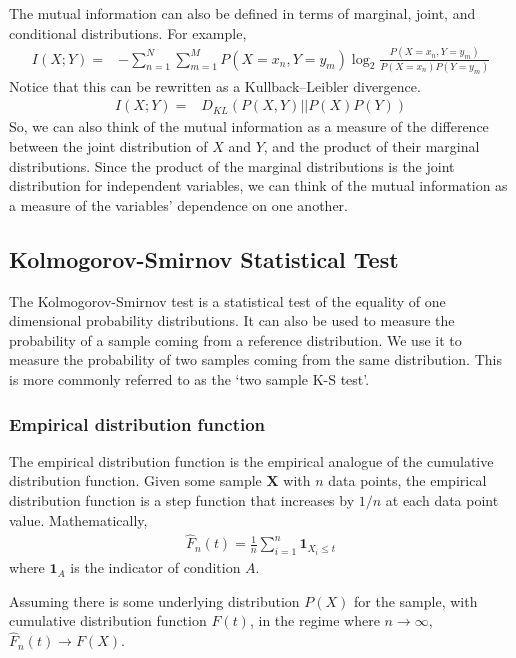 \documentclass[a4paper,12pt]{article}
\theoremstyle{definition}
\begin{document}
The mutual information can also be defined in terms of marginal, joint, and conditional distributions. For example,
\begin{align}
I(X;Y)  =& -\sum_{n=1}^N \sum_{m=1}^M P(X=x_n, Y=y_m) \log _2 \frac{P(X=x_n, Y=y_m)}{P(X=x_n) P(Y=y_m)}
\end{align}
Notice that this can be rewritten as a Kullback–Leibler divergence.
\begin{align}
I(X;Y)  =& D_{KL}(P(X,Y)|| P(X)P(Y))
\end{align}
So, we can also think of the mutual information as a measure of the difference between the joint distribution of $X$ and $Y$, and the product of their marginal distributions. Since the product of the marginal distributions is the joint distribution for independent variables, we can think of the mutual information as a measure of the variables' dependence on one another.

\subsection{Kolmogorov-Smirnov Statistical Test}\label{sec:ks_test}
The Kolmogorov-Smirnov test is a statistical test of the equality of one dimensional probability distributions. It can also be used to measure the probability of a sample coming from a reference distribution. We use it to measure the probability of two samples coming from the same distribution. This is more commonly referred to as the `two sample K-S test'.

\subsubsection{Empirical distribution function}
The empirical distribution function is the empirical analogue of the cumulative distribution function. Given some sample $\mathbf{X}$ with $n$ data points, the empirical distribution function is a step function that increases by $1/n$ at each data point value. Mathematically,
\begin{align}
  \hat{F}_{n}(t) = \frac{1}{n} \sum_{i=1}^n \mathbf{1}_{X_i \leq t}
\end{align}
where $\mathbf{1}_{A}$ is the indicator of condition $A$.

Assuming there is some underlying distribution $P(X)$ for the sample, with cumulative distribution function $F(t)$, in the regime where $n \rightarrow \infty$, $\hat{F}_n (t) \rightarrow F(X)$.
\end{document}
